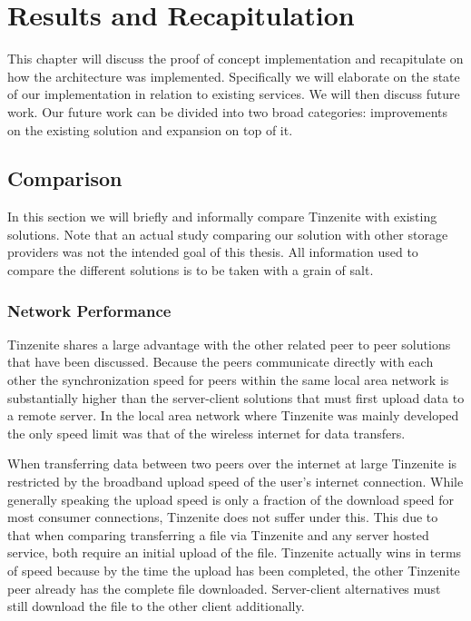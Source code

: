 \chapter{Results and Recapitulation}
\label{chap:Results and Recapitulation}

This chapter will discuss the proof of concept implementation and recapitulate on how the architecture was implemented.
Specifically we will elaborate on the state of our implementation in relation to existing services.
We will then discuss future work.
Our future work can be divided into two broad categories: improvements on the existing solution and expansion on top of it.

\section{Comparison}

In this section we will briefly and informally compare Tinzenite with existing solutions.
Note that an actual study comparing our solution with other storage providers was not the intended goal of this thesis.
All information used to compare the different solutions is to be taken with a grain of salt.

\subsection{Network Performance}
\label{sub:Performance}

Tinzenite shares a large advantage with the other related peer to peer solutions that have been discussed.
Because the peers communicate directly with each other the synchronization speed for peers within the same local area network is substantially higher than the server-client solutions that must first upload data to a remote server.
In the local area network where Tinzenite was mainly developed the only speed limit was that of the wireless internet for data transfers.

When transferring data between two peers over the internet at large Tinzenite is restricted by the broadband upload speed of the user's internet connection.
While generally speaking the upload speed is only a fraction of the download speed for most consumer connections, Tinzenite does not suffer under this.
This due to that when comparing transferring a file via Tinzenite and any server hosted service, both require an initial upload of the file.
Tinzenite actually wins in terms of speed because by the time the upload has been completed, the other Tinzenite peer already has the complete file downloaded.
Server-client alternatives must still download the file to the other client additionally.

